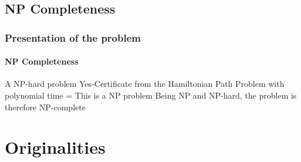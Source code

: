 \documentclass{beamer}
\begin{document}
	\subsection{NP Completeness}
	\begin{frame}
		\frametitle{Presentation of the problem}
		\framesubtitle{NP Completeness}
		A NP-hard problem \newline
		Yes-Certificate from the Hamiltonian Path Problem with polynomial time = This is a NP problem \newline
		Being NP and NP-hard, the problem is therefore NP-complete
	\end{frame}
	\section{Originalities}
\end{document}
